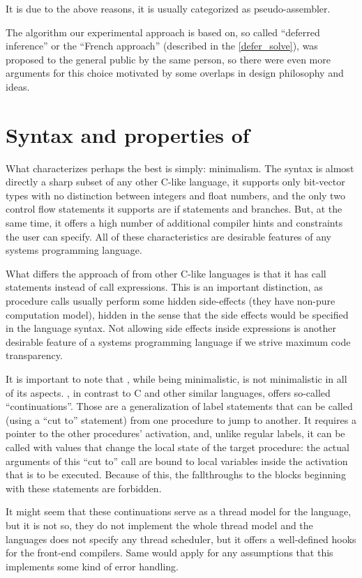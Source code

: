 It is due to the above reasons, it is usually categorized as pseudo-assembler.

The algorithm our experimental approach is based on, so called ``deferred inference'' or the ``French approach'' (described in the \cref{defer_solve}), was proposed to the general public by the same person, so there were even more arguments for this choice motivated by some overlaps in design philosophy and ideas.

\section{Syntax and properties of \cmm{}}

What characterizes \cmm{} perhaps the best is simply: minimalism. The syntax is almost directly a sharp subset of any other C-like language, it supports only bit-vector types with no distinction between integers and float numbers, and the only two control flow statements it supports are if statements and branches. But, at the same time, it offers a high number of additional compiler hints and constraints the user can specify. All of these characteristics are desirable features of any systems programming language.

What differs the approach of \cmm{} from other C-like languages is that it has call statements instead of call expressions. This is an important distinction, as procedure calls usually perform some hidden side-effects (they have non-pure computation model), hidden in the sense that the side effects would be specified in the language syntax. Not allowing side effects inside expressions is another desirable feature of a systems programming language if we strive maximum code transparency.

It is important to note that \cmm{}, while being minimalistic, is not minimalistic in all of its aspects. \cmm{}, in contrast to C and other similar languages, offers so-called ``continuations''. Those are a generalization of label statements that can be called (using a ``cut to'' statement) from one procedure to jump to another. It requires a pointer to the other procedures' activation, and, unlike regular labels, it can be called with values that change the local state of the target procedure: the actual arguments of this ``cut to'' call are bound to local variables inside the activation that is to be executed. Because of this, the fallthroughs to the blocks beginning with these statements are forbidden.

It might seem that these continuations serve as a thread model for the language, but it is not so, they do not implement the whole thread model and the languages does not specify any thread scheduler, but it offers a well-defined hooks for the front-end compilers. Same would apply for any assumptions that this implements some kind of error handling.

